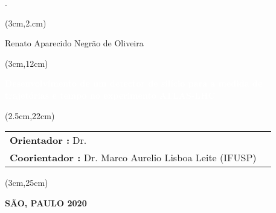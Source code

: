 \begin{titlepage}.
    

    \vspace{3.5cm}

    
    \begin{textblock*}{15cm}(3cm,2.cm)
        \makeatletter
        \begin{huge}
            \begin{center}
                \color{black}
                 Renato Aparecido Negrão de Oliveira\\ 
            \end{center}
         \end{huge}
     
    \end{textblock*}
    
    \begin{textblock*}{15cm}(3cm,12cm)
        \begin{Huge}
            \begin{center}
                \makeatletter
                \noindent\textcolor{white}{\textbf{Desenvolvimento de um detector de silício para a medida de trajetórias e tempo no experimento ATLAS-LHC}}
                \makeatother
            \end{center}
        \end{Huge}
    \end{textblock*}

    \begin{textblock*}{15cm}(2.5cm,22cm)
        \makeatletter
        \begin{LARGE}
            \setcellgapes{4pt}
            \makegapedcells
            {\color{black}\begin{tabularx}{15cm}{XX}
                \textbf{Orientador :} Dr. \\ 
                \textbf{Coorientador :} Dr. 
Marco Aurelio Lisboa Leite (IFUSP)
            \end{tabularx}}
        \end{LARGE}
        \makeatother
    \end{textblock*}
    
    \begin{textblock*}{15cm}(3cm,25cm)
        \makeatletter
        \begin{center}
            {\color{black}
                \textbf{SÃO, PAULO 2020} 
            }
        \end{center}
        \makeatother
    \end{textblock*}

\end{titlepage}

